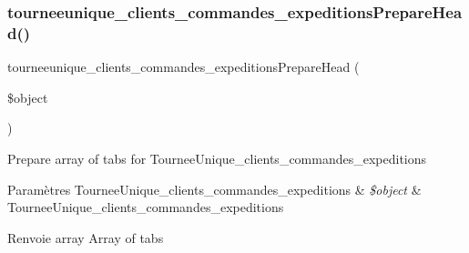 \subsubsection{\texorpdfstring{tourneeunique\+\_\+clients\+\_\+commandes\+\_\+expeditions\+Prepare\+Head()}{tourneeunique\_clients\_commandes\_expeditionsPrepareHead()}}
{\footnotesize\ttfamily tourneeunique\+\_\+clients\+\_\+commandes\+\_\+expeditions\+Prepare\+Head (\begin{DoxyParamCaption}\item[{}]{\$object }\end{DoxyParamCaption})}

Prepare array of tabs for Tournee\+Unique\+\_\+clients\+\_\+commandes\+\_\+expeditions


\begin{DoxyParams}[1]{Paramètres}
Tournee\+Unique\+\_\+clients\+\_\+commandes\+\_\+expeditions & {\em \$object} & Tournee\+Unique\+\_\+clients\+\_\+commandes\+\_\+expeditions \\
\hline
\end{DoxyParams}
\begin{DoxyReturn}{Renvoie}
array Array of tabs 
\end{DoxyReturn}
